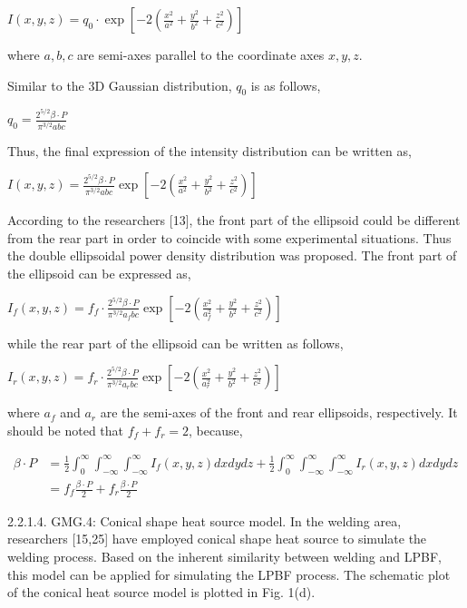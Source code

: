 \documentclass[10pt]{article}
\begin{document}
$I(x, y, z)=q_{0} \cdot \exp \left[-2\left(\frac{x^{2}}{a^{2}}+\frac{y^{2}}{b^{2}}+\frac{z^{2}}{c^{2}}\right)\right]$

where $a, b, c$ are semi-axes parallel to the coordinate axes $x, y, z$.

Similar to the 3D Gaussian distribution, $q_{0}$ is as follows,

$q_{0}=\frac{2^{5 / 2} \beta \cdot P}{\pi^{3 / 2} a b c}$

Thus, the final expression of the intensity distribution can be written as,

$I(x, y, z)=\frac{2^{5 / 2} \beta \cdot P}{\pi^{3 / 2} a b c} \exp \left[-2\left(\frac{x^{2}}{a^{2}}+\frac{y^{2}}{b^{2}}+\frac{z^{2}}{c^{2}}\right)\right]$

According to the researchers [13], the front part of the ellipsoid could be different from the rear part in order to coincide with some experimental situations. Thus the double ellipsoidal power density distribution was proposed. The front part of the ellipsoid can be expressed as,

$I_{f}(x, y, z)=f_{f} \cdot \frac{2^{5 / 2} \beta \cdot P}{\pi^{3 / 2} a_{f} b c} \exp \left[-2\left(\frac{x^{2}}{a_{f}^{2}}+\frac{y^{2}}{b^{2}}+\frac{z^{2}}{c^{2}}\right)\right]$

while the rear part of the ellipsoid can be written as follows,

$I_{r}(x, y, z)=f_{r} \cdot \frac{2^{5 / 2} \beta \cdot P}{\pi^{3 / 2} a_{r} b c} \exp \left[-2\left(\frac{x^{2}}{a_{r}^{2}}+\frac{y^{2}}{b^{2}}+\frac{z^{2}}{c^{2}}\right)\right]$

where $a_{f}$ and $a_{r}$ are the semi-axes of the front and rear ellipsoids, respectively. It should be noted that $f_{f}+f_{r}=2$, because,


\begin{align*}
\beta \cdot P & =\frac{1}{2} \int_{0}^{\infty} \int_{-\infty}^{\infty} \int_{-\infty}^{\infty} I_{f}(x, y, z) d x d y d z+\frac{1}{2} \int_{0}^{\infty} \int_{-\infty}^{\infty} \int_{-\infty}^{\infty} I_{r}(x, y, z) d x d y d z \\
& =f_{f} \frac{\beta \cdot P}{2}+f_{r} \frac{\beta \cdot P}{2} \tag{15}
\end{align*}


2.2.1.4. GMG.4: Conical shape heat source model. In the welding area, researchers [15,25] have employed conical shape heat source to simulate the welding process. Based on the inherent similarity between welding and LPBF, this model can be applied for simulating the LPBF process. The schematic plot of the conical heat source model is plotted in Fig. 1(d).
\end{document}
